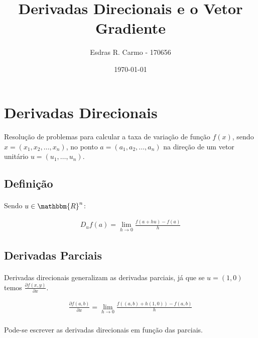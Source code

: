 \documentclass{article}
\author{Esdras R. Carmo - 170656}
\title{Derivadas Direcionais e o Vetor Gradiente}
\date{\today}
\newcommand{\PartialDer}[2] {\frac{\partial #1} {\partial #2}}
\begin{document}
    \maketitle
    
    
    \section{Derivadas Direcionais}
        \paragraph{}
        Resolução de problemas para calcular a taxa de variação de função $f(x)$, sendo $x = (x_1, x_2, \dots, x_n)$,
        no ponto $a = (a_1, a_2, \dots, a_n)$ na direção de um vetor unitário $u = (u_1, \dots, u_n)$.

        \subsection{Definição}
            \paragraph{}
            Sendo $u \in \mathbbm{R}^n$:

            \begin{align*}
                D_u f(a) = \lim_{h \to 0} \frac{f(a + hu) - f(a)} {h}
            \end{align*}

        \subsection{Derivadas Parciais}
            \paragraph{}
            Derivadas direcionais generalizam as derivadas parciais, já que se $u = (1, 0)$ temos $\PartialDer{f(x, y)}{x}$.

            \begin{align*}
                \PartialDer{f(a, b)}{x} = \lim_{h \to 0} \frac {f( (a, b) + h(1, 0) ) - f(a, b)}{h}
            \end{align*}

            \paragraph{}
            Pode-se escrever as derivadas direcionais em função das parciais.
\end{document}
